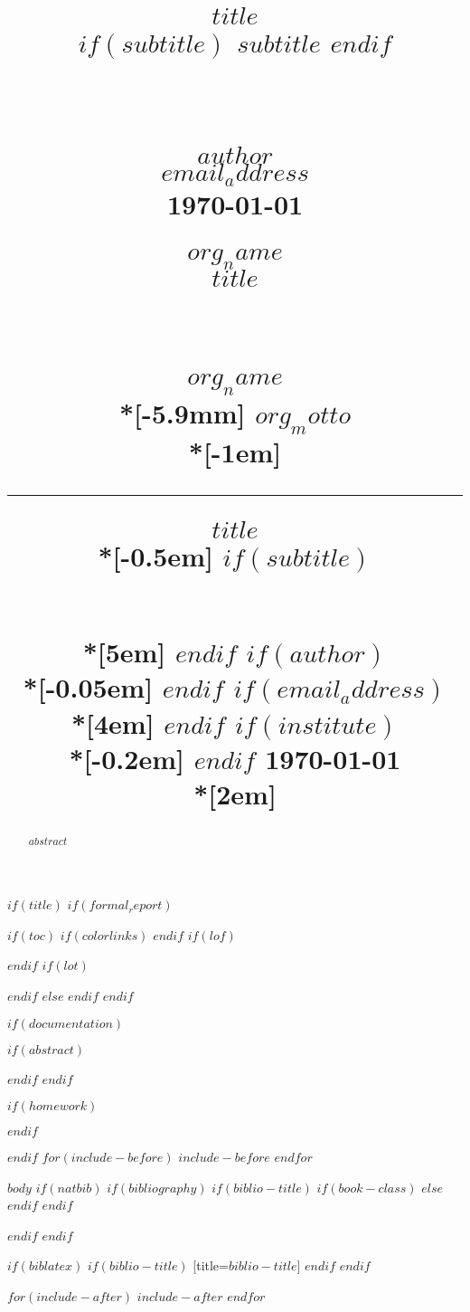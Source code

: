 \documentclass[$if(fontsize)$$fontsize$,$endif$$if(lang)$$babel-lang$,$endif$$if(papersize)$$papersize$paper,$endif$$for(classoption)$$classoption$$sep$,$endfor$]{$documentclass$}
\title{
    \normalsize
    \begin{flushright}
        \vspace{-7mm}
        \fontsize{22pt}{22pt} \color{black} \textbf{$title$} \\
        \vspace{0.3em}
        $if(subtitle)$
        \hspace{-0.5em}
        \fontsize{20pt}{20pt}\color{$subtlecolor$} \textbf{$subtitle$}
        $endif$
        \vspace{-0.5em}
    \end{flushright}
    \horrule{0.4pt} \\[-0.5em]
}
\date{\vspace{-8mm}}
\title{
    \normalsize
    \begin{flushright}
        \vspace{-3em}
        \large \textbf{\textsf{$author$}} \\
        \vspace{-0.03em}
        \normalsize \textbf{\textsf{\color{$maincolor$}$email_address$}} \\
        \vspace{-0.05em}
        \textsf{\today} \\
        \vspace{1.15em}
    \end{flushright}
    \vspace{-6.0em}
    \begin{flushleft}
        \Huge \textbf{\textsf{\color{$maincolor$}$org_name$} }\\ %
        \vspace{0.07em}
        \Large \textbf{\textsf{\color{$if(grayscale)$$othercolorbw$$else$$othercolor$$endif$}$title$}} \\
        \vspace{-0.3em}
    \end{flushleft}
    \horrule{0.2pt} \\[0.5em] %
}
\date{\vspace{-4em}}
\title{
    \begin{flushright}
        \sffamily
        \vspace*{0em}
        \noindent
        \hspace{-0.40em}\YUGE 	\bfseries	\color{$if(grayscale)$$othercolorbw$$else$$othercolor$$endif$} \textbf{$org_name$} \\*[-5.9mm]
        \Yuge 		\color{black} \textbf{$org_motto$}   \\*[-1em]
        \color{black}		\hrule 		 	\vspace   	{10em}
    \end{flushright}
    \begin{flushleft}
        \sffamily
        \Subtitle  	\color{$maincolor$} \textbf{$title$}		\\*[-0.5em]
        $if(subtitle)$
        \hspace{-0.80em} \subtitle	\color{$if(grayscale)$$othercolorbw$$else$$othercolor$$endif$} \text{ $subtitle$} 	\\*[5em]
        $endif$
        $if(author)$
        \Huge	\color{black} \text{$author$}		\\*[-0.05em]
        $endif$
        $if(email_address)$
        \LARGE	\color{$if(grayscale)$$othercolorbw$$else$$othercolor$$endif$} \text{$email_address$}	\\*[4em]
        $endif$
        $if(institute)$
        \Large	\color{black}	\text{$institute$} 	\\*[-0.2em]
        $endif$
        \Large		\color{$if(grayscale)$$othercolorbw$$else$$othercolor$$endif$}			\today				\\*[2em]
    \end{flushleft}
    }
\date{\vspace{1mm}}
\begin{document}
$if(title)$
$if(formal_report)$
\thispagestyle{title}
\maketitle
{} \vspace{-20mm}
$if(toc)$	{
$if(colorlinks)$
$endif$
\setcounter{tocdepth}{$toc-depth$}
\tableofcontents \vspace{15mm}
}
\thispagestyle{plain}
$if(lof)$
\listoffigures
$endif$
$if(lot)$
\listoftables	\vspace{5mm}
$endif$
\cleardoublepage
{}
\newpage
$else$
\thispagestyle{plain}
$endif$
$endif$

$if(documentation)$
\maketitle
$if(abstract)$
\begin{abstract}
$abstract$
\end{abstract}
$endif$
$endif$

$if(homework)$
\maketitle \vspace{3mm}
$endif$

$endif$
$for(include-before)$
$include-before$
$endfor$

$body$
$if(natbib)$
$if(bibliography)$
$if(biblio-title)$
$if(book-class)$
\renewcommand\bibname{$biblio-title$}
$else$
\renewcommand\refname{$biblio-title$}
$endif$
$endif$

$endif$
$endif$

$if(biblatex)$
\printbibliography
$if(biblio-title)$
[title=$biblio-title$]
$endif$
$endif$

$for(include-after)$
$include-after$
$endfor$
\end{document}
